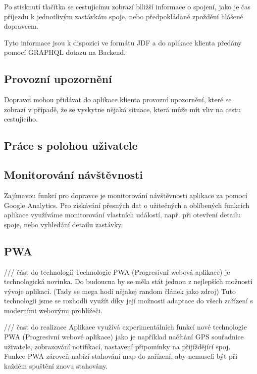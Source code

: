 Po stisknutí tlačítka se cestujícímu zobrazí blližší informace o spojení, jako je čas příjezdu k jednotlivým zastávkám spoje, nebo předpokládané zpoždění hlášené dopravcem.

Tyto informace jsou k dispozici ve formátu JDF a do aplikace klienta předány pomocí GRAPHQL dotazu na Backend.

\subsection{Provozní upozornění}
Dopravci mohou přidávat do aplikace klienta provozní upozornění, které se zobrazí v případě, že se vyskytne nějaká situace, která může mít vliv na cestu cestujícího.
\subsection{Práce s polohou uživatele}
\subsection{Monitorování návštěvnosti}
Zajímavou funkcí pro dopravce je monitorování návštěvnosti aplikace za pomocí Google Analytics. Pro získávání přesných dat o užitečných a oblíbených funkcích aplikace využíváme monitorování vlastních událostí, např. při otevření detailu spoje, nebo vyhledání detailu zastávky.
\subsection{PWA}

 /// část do technologíí
Technologie PWA (Progresivní webová aplikace) je technologická novinka. Do budoucna by se měla stát jednou z nejlepších možností vývoje aplikací. (Tady se mega hodí nějakej random článek jako zdroj)
Tuto technologii jsme se rozhodli využít díky její možnosti adaptace do všech zařízení s moderními webovými prohlížeči.

 /// čast do realizace
Aplikace využívá experimentálních funkcí nové technologie PWA (Progresivní webové aplikace) jako je například načítání GPS souřadnice uživatele, zobrazování notifikací, nastavení připomínky na přijíždějící spoj.
Funkce PWA zároveň nabízí stahování map do zařízení, aby nemuseli být při každém spuštění znovu stahovány.